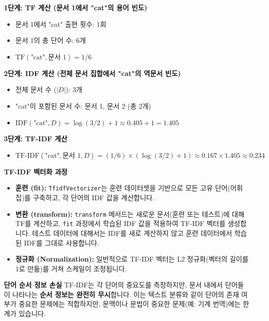 \documentclass[11pt,a4paper]{book}
\theoremstyle{definition}
\begin{document}
\begin{enumerate}
\begin{examplebox}
    \textbf{1단계: TF 계산 (문서 1에서 "cat"의 용어 빈도)}
    \begin{itemize}
        \item 문서 1에서 "cat" 출현 횟수: 1회
        \item 문서 1의 총 단어 수: 6개
        \item $\text{TF}(\text{"cat"}, \text{문서 1}) = 1/6$
    \end{itemize}

    \textbf{2단계: IDF 계산 (전체 문서 집합에서 "cat"의 역문서 빈도)}
    \begin{itemize}
        \item 전체 문서 수 ($|D|$): 3개
        \item "cat"이 포함된 문서 수: 문서 1, 문서 2 (총 2개)
        \item $\text{IDF}(\text{"cat"}, D) = \log(3/2) + 1 \approx 0.405 + 1 = 1.405$
    \end{itemize}

    \textbf{3단계: TF-IDF 계산}
    \begin{itemize}
        \item $\text{TF-IDF}(\text{"cat"}, \text{문서 1}, D) = (1/6) \times (\log(3/2) + 1) \approx 0.167 \times 1.405 \approx 0.234$
    \end{itemize}
    \end{examplebox}

    \begin{tipbox}
    \textbf{TF-IDF 벡터화 과정}
    \begin{itemize}
        \item \textbf{훈련 (fit):} \texttt{TfidfVectorizer}는 훈련 데이터셋을 기반으로 모든 고유 단어(어휘집)를 구축하고, 각 단어의 IDF 값을 계산합니다.
        \item \textbf{변환 (transform):} \texttt{transform} 메서드는 새로운 문서(훈련 또는 테스트)에 대해 TF를 계산하고, \texttt{fit} 과정에서 학습된 IDF 값을 적용하여 TF-IDF 벡터를 생성합니다. 테스트 데이터에 대해서는 IDF를 새로 계산하지 않고 훈련 데이터에서 학습된 IDF를 그대로 사용합니다.
        \item \textbf{정규화 (Normalization):} 일반적으로 TF-IDF 벡터는 L2 정규화(벡터의 길이를 1로 만듦)를 거쳐 스케일이 조정됩니다.
    \end{itemize}
    \end{tipbox}

    \begin{cautionbox}
    \textbf{단어 순서 정보 손실}
    TF-IDF는 각 단어의 중요도를 측정하지만, 문서 내에서 단어들이 나타나는 \textbf{순서 정보는 완전히 무시}합니다. 이는 텍스트 분류와 같이 단어의 존재 여부가 중요한 문제에는 적합하지만, 문맥이나 문법이 중요한 문제(예: 기계 번역)에는 한계가 있습니다.
    \end{cautionbox}
\end{enumerate}
\end{document}
